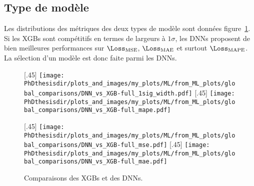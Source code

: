 \subsection{Type de modèle}
Les distributions des métriques des deux types de modèle sont données figure~\ref{fig-DNN_vs_XGB}.
Si les XGBs sont compétitifs en termes de largeurs à $1\sigma$, les DNNs proposent de bien meilleures performances sur $\Loss_\text{MSE}$, $\Loss_\text{MAE}$ et surtout $\Loss_\text{MAPE}$.
La sélection d'un modèle est donc faite parmi les DNNs.
\begin{figure}[h]
\centering

\subcaptionbox{}[.45\textwidth]
{\texttt{[image: \\PhDthesisdir/plots\_and\_images/my\_plots/ML/from\_ML\_plots/global\_comparisons/DNN\_vs\_XGB-full\_1sig\_width.pdf]}\vspace{-\baselineskip}}
\hfill
\subcaptionbox{}[.45\textwidth]
{\texttt{[image: \\PhDthesisdir/plots\_and\_images/my\_plots/ML/from\_ML\_plots/global\_comparisons/DNN\_vs\_XGB-full\_mape.pdf]}\vspace{-\baselineskip}}

\vspace{\baselineskip}

\subcaptionbox{}[.45\textwidth]
{\texttt{[image: \\PhDthesisdir/plots\_and\_images/my\_plots/ML/from\_ML\_plots/global\_comparisons/DNN\_vs\_XGB-full\_mse.pdf]}\vspace{-\baselineskip}}
\hfill
\subcaptionbox{}[.45\textwidth]
{\texttt{[image: \\PhDthesisdir/plots\_and\_images/my\_plots/ML/from\_ML\_plots/global\_comparisons/DNN\_vs\_XGB-full\_mae.pdf]}\vspace{-\baselineskip}}

\caption{Comparaisons des XGBs et des DNNs.}
\label{fig-DNN_vs_XGB}
\end{figure}
\newpage
